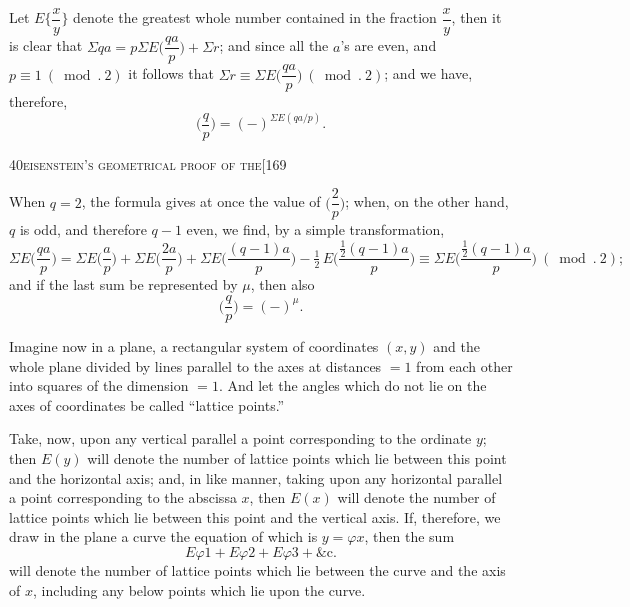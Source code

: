 \documentclass[11pt]{article}
\begin{document}
Let $E\biggl\{\dfrac{x}{y}\biggr\}$ denote the greatest whole number contained in the fraction $\dfrac{x}{y}$, then it is
clear that $\Sigma q a = p \Sigma E\biggl(\dfrac{qa}{p}\biggr) + \Sigma r$; and since all the $a$'s are even, and $p \equiv 1\ (\bmod.\ 2)$ it
follows that $\Sigma r \equiv \Sigma E\biggl(\dfrac{qa}{p}\biggr)\ (\bmod.\ 2)$; and we have, therefore,
\[
\biggl(\frac{q}{p}\biggr) = (-)^{\Sigma E(qa/p)}.
\]

\newpage

\begin{center}
\small\textsc{40}\hfill\textsc{eisenstein's geometrical proof of the}\hfill[169
\end{center}

\medskip

\noindent When $q = 2$, the formula gives at once the value of $\biggl(\dfrac{2}{p}\biggr)$; when, on the other hand,
$q$ is odd, and therefore $q - 1$ even, we find, by a simple transformation,
\[
\Sigma E\biggl(\frac{q a}{p}\biggr) = \Sigma E\biggl(\frac{a}{p}\biggr) + \Sigma E\biggl(\frac{2a}{p}\biggr) + \Sigma E\biggl(\frac{(q-1)a}{p}\biggr) - \tfrac{1}{2}\,E\biggl(\frac{\tfrac{1}{2}(q-1)a}{p}\biggr)
\equiv \Sigma E\biggl(\frac{\tfrac{1}{2}(q-1)a}{p}\biggr)\ (\bmod.\ 2);
\]
and if the last sum be represented by $\mu$, then also
\[
\biggl(\frac{q}{p}\biggr) = (-)^{\mu}.
\]

Imagine now in a plane, a rectangular system of coordinates $(x, y)$ and the whole
plane divided by lines parallel to the axes at distances $= 1$ from each other into
squares of the dimension $= 1$. And let the angles which do not lie on the axes of
coordinates be called ``lattice points.''

Take, now, upon any vertical parallel a point corresponding to the ordinate $y$;
then $E(y)$ will denote the number of lattice points which lie between this point and
the horizontal axis; and, in like manner, taking upon any horizontal parallel a point
corresponding to the abscissa $x$, then $E(x)$ will denote the number of lattice points
which lie between this point and the vertical axis. If, therefore, we draw in the
plane a curve the equation of which is $y = \varphi x$, then the sum
\[
E\varphi 1 + E\varphi 2 + E\varphi 3 + \&\text{c.}
\]
will denote the number of lattice points which lie between the curve and the axis
of $x$, including any below points which lie upon the curve.
\end{document}
